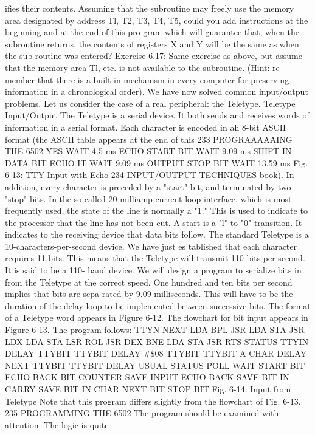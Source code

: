 \documentclass{book}
\begin{document}
ifies their contents. Assuming that the subroutine may freely use
the memory area designated by address Tl, T2, T3, T4, T5, could
you add instructions at the beginning and at the end of this pro
gram which will guarantee that, when the subroutine returns, the
contents of registers X and Y will be the same as when the sub
routine was entered?
Exercise 6.17: Same exercise as above, but assume that the
memory area Tl, etc. is not available to the subroutine. (Hint: re
member that there is a built-in mechanism in every computer for
preserving information in a chronological order).
We have now solved common input/output problems. Let us
consider the case of a real peripheral: the Teletype.
Teletype Input/Output
The Teletype is a serial device. It both sends and receives words
of information in a serial format. Each character is encoded in ah
8-bit ASCII format (the ASCII table appears at the end of this
233
PROGRAAAAAING THE 6502
YES
WAIT 4.5 ms
ECHO START BIT
WAIT 9.09 ms
SHIFT IN DATA BIT
ECHO IT
WAIT 9.09 ms
OUTPUT STOP BIT
WAIT 13.59 ms
Fig. 6-13: TTY Input with Echo
234
INPUT/OUTPUT TECHNIQUES
book). In addition, every character is preceded by a "start" bit,
and terminated by two "stop" bits. In the so-called 20-milliamp
current loop interface, which is most frequently used, the state of
the line is normally a "1." This is used to indicate to the processor
that the line has not been cut. A start is a "l"-to-"0" transition. It
indicates to the receiving device that data bits follow. The standard
Teletype is a 10-characters-per-second device. We have just es
tablished that each character requires 11 bits. This means that
the Teletype will transmit 110 bits per second. It is said to be a 110-
baud device. We will design a program to serialize bits in from the
Teletype at the correct speed.
One hundred and ten bits per second implies that bits are sepa
rated by 9.09 milliseconds. This will have to be the duration of the
delay loop to be implemented between successive bits. The format
of a Teletype word appears in Figure 6-12. The flowchart for bit
input appears in Figure 6-13. The program follows:
TTYN
NEXT
LDA
BPL
JSR
LDA
STA
JSR
LDX
LDA
STA
LSR
ROL
JSR
DEX
BNE
LDA
STA
JSR
RTS
STATUS
TTYIN
DELAY
TTYBIT
TTYBIT
DELAY
#\$08
TTYBIT
TTYBIT
A
CHAR
DELAY
NEXT
TTYBIT
TTYBIT
DELAY
USUAL STATUS POLL
WAIT
START BIT
ECHO BACK
BIT COUNTER
SAVE INPUT
ECHO BACK
SAVE BIT IN CARRY
SAVE BIT IN CHAR
NEXT BIT
STOP BIT
Fig. 6-14: Input from Teletype
Note that this program differs slightly from the flowchart of Fig. 6-13.
235
PROGRAMMING THE 6502
The program should be examined with attention. The logic is quite
\end{document}
